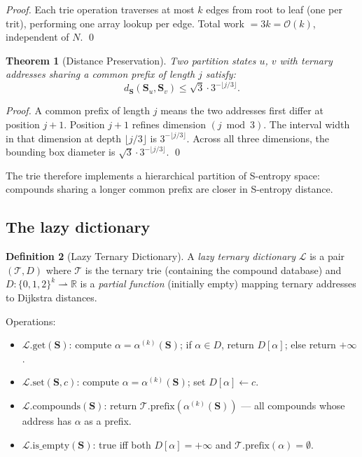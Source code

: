 \documentclass[twocolumn,10pt,a4paper]{article}
\theoremstyle{thmstyle}
\newtheorem{theorem}{Theorem}[section]
\theoremstyle{definition}
\newtheorem{definition}[theorem]{Definition}
\theoremstyle{remark}
\newcommand{\Sv}{\mathbf{S}}
\begin{document}
\begin{proof}
Each trie operation traverses at most $k$ edges from root to leaf
(one per trit), performing one array lookup per edge. Total work
$= 3k = \mathcal{O}(k)$, independent of $N$. \qed
\end{proof}

\begin{theorem}[Distance Preservation]
\label{thm:trie-distance}
Two partition states $u$, $v$ with ternary addresses sharing a common
prefix of length $j$ satisfy:
\begin{equation}
d_{\Sv}(\Sv_u, \Sv_v) \leq \sqrt{3} \cdot 3^{-\lfloor j/3 \rfloor}.
\label{eq:trie-dist}
\end{equation}
\end{theorem}

\begin{proof}
A common prefix of length $j$ means the two addresses first differ at
position $j+1$. Position $j+1$ refines dimension $(j \bmod 3)$. The
interval width in that dimension at depth $\lfloor j/3\rfloor$ is
$3^{-\lfloor j/3\rfloor}$. Across all three dimensions, the bounding
box diameter is $\sqrt{3} \cdot 3^{-\lfloor j/3\rfloor}$. \qed
\end{proof}

The trie therefore implements a hierarchical partition of S-entropy space:
compounds sharing a longer common prefix are closer in S-entropy distance.

\subsection{The lazy dictionary}

\begin{definition}[Lazy Ternary Dictionary]
\label{def:lazydict}
A \emph{lazy ternary dictionary} $\mathcal{L}$ is a pair
$(\mathcal{T}, D)$ where $\mathcal{T}$ is the ternary trie
(containing the compound database) and
$D: \{0,1,2\}^k \rightharpoonup \mathbb{R}$ is a \emph{partial function}
(initially empty) mapping ternary addresses to Dijkstra distances.

Operations:
\begin{itemize}[nosep]
\item $\mathcal{L}.\text{get}(\Sv)$: compute $\alpha = \alpha^{(k)}(\Sv)$;
  if $\alpha \in D$, return $D[\alpha]$; else return $+\infty$.
\item $\mathcal{L}.\text{set}(\Sv, c)$: compute $\alpha = \alpha^{(k)}(\Sv)$;
  set $D[\alpha] \leftarrow c$.
\item $\mathcal{L}.\text{compounds}(\Sv)$: return $\mathcal{T}.\text{prefix}(\alpha^{(k)}(\Sv))$
  --- all compounds whose address has $\alpha$ as a prefix.
\item $\mathcal{L}.\text{is\_empty}(\Sv)$: true iff both $D[\alpha] = +\infty$
  and $\mathcal{T}.\text{prefix}(\alpha) = \emptyset$.
\end{itemize}
\end{definition}
\end{document}
